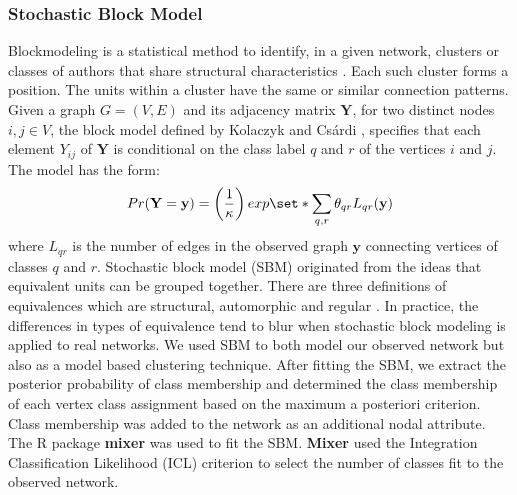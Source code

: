 \subsubsection{Stochastic Block Model}
\label{sec:methods_sbm}
Blockmodeling is a statistical method to identify, in a given network, clusters or classes of authors that share structural characteristics \cite{lorrain_structural_1971,doreian_generalized_2004}. Each such cluster forms a position. The units within a cluster have the same or similar connection patterns. Given a graph $G=(V,E)$ and its adjacency matrix $\mathbf{Y}$, for two distinct nodes $i,j \in V$, the block model defined by Kolaczyk and Cs\'ardi \cite{kolaczyk_statistical_2014}, specifies that each element $Y_{ij}$ of $\mathbf{Y}$ is conditional on the class label $q$ and $r$ of the vertices $i$ and $j$. The model has the form:
\begin{equation}Pr(\mathbf{Y}=\mathbf{y})=\left( \frac{1}{\kappa} \right) exp \set*{ \sum_{q,r} \theta_{qr} L_{qr}(\mathbf{y}) }\end{equation}
where $L_{qr}$ is the number of edges in the observed graph $\mathbf{y}$ connecting vertices of classes $q$ and $r$. 
Stochastic block model (SBM) originated from the ideas that equivalent units can be grouped together. There are three definitions of equivalences which are structural, automorphic and regular \cite{mali_dynamic_2012}. In practice, the differences in types of equivalence tend to blur when stochastic block modeling is applied to real networks. We used SBM to both model our observed network but also as a model based clustering technique. After fitting the SBM, we extract the posterior probability of class membership and determined the class membership of each vertex class assignment based on the maximum a posteriori criterion. Class membership was added to the network as an additional nodal attribute. The R package \textbf{mixer} was used to fit the SBM. \textbf{Mixer} used the Integration Classification Likelihood (ICL) criterion to select the number of classes fit to the observed network.
%

